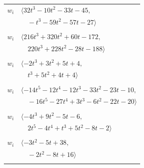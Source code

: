 \documentclass[11pt]{article}
\begin{document}
\begin{longtable}{@{}ll@{}}
$w_i$ & $\langle 32t^{3}-10t^{2}-33t-45,$\\
 & $\quad -t^{3}-59t^{2}-57t-27\rangle$\\
\addlinespace[2pt]
\multicolumn{2}{@{}p{0.97\textwidth}@{}}{$i=32$, $D_i=1$, $\rho_{ij}$: $1{:}2, \allowbreak 2{:}2, \allowbreak 3{:}2, \allowbreak 15{:}1, \allowbreak 24{:}2, \allowbreak 25{:}2, \allowbreak 26{:}2, \allowbreak 27{:}1, \allowbreak 29{:}2, \allowbreak 31{:}2, \allowbreak 36{:}2$}\\
$w_i$ & $\langle 216t^{3}+320t^{2}+60t-172,$\\
 & $\quad 220t^{3}+228t^{2}-28t-188\rangle$\\
\addlinespace[2pt]
\multicolumn{2}{@{}p{0.97\textwidth}@{}}{$i=33$, $D_i=1$, $\rho_{ij}$: $5{:}1, \allowbreak 14{:}2, \allowbreak 16{:}1, \allowbreak 20{:}2, \allowbreak 21{:}2$}\\
$w_i$ & $\langle -2t^{3}+3t^{2}+5t+4,$\\
 & $\quad t^{3}+5t^{2}+4t+4\rangle$\\
\addlinespace[2pt]
\multicolumn{2}{@{}p{0.97\textwidth}@{}}{$i=34$, $D_i=1$, $\rho_{ij}$: $8{:}1, \allowbreak 12{:}2, \allowbreak 16{:}2, \allowbreak 20{:}2, \allowbreak 21{:}1, \allowbreak 22{:}2, \allowbreak 27{:}2, \allowbreak 30{:}2, \allowbreak 31{:}2, \allowbreak 36{:}2$}\\
$w_i$ & $\langle -14t^{5}-12t^{4}-12t^{3}-33t^{2}-23t-10,$\\
 & $\quad -16t^{5}-27t^{4}+3t^{3}-6t^{2}-22t-20\rangle$\\
\addlinespace[2pt]
\multicolumn{2}{@{}p{0.97\textwidth}@{}}{$i=35$, $D_i=1$, $\rho_{ij}$: $3{:}2, \allowbreak 6{:}1, \allowbreak 7{:}2, \allowbreak 8{:}1, \allowbreak 17{:}1, \allowbreak 19{:}1, \allowbreak 23{:}2, \allowbreak 29{:}2$}\\
$w_i$ & $\langle -4t^{3}+9t^{2}-5t-6,$\\
 & $\quad 2t^{5}-4t^{4}+t^{3}+5t^{2}-8t-2\rangle$\\
\addlinespace[2pt]
\multicolumn{2}{@{}p{0.97\textwidth}@{}}{$i=36$, $D_i=1$, $\rho_{ij}$: $14{:}2, \allowbreak 18{:}2, \allowbreak 21{:}2, \allowbreak 25{:}2, \allowbreak 27{:}1, \allowbreak 32{:}1, \allowbreak 34{:}1$}\\
$w_i$ & $\langle -3t^{2}-5t+38,$\\
 & $\quad -2t^{2}-8t+16\rangle$\\
\addlinespace[2pt]
\end{longtable}
\endgroup
\end{document}
